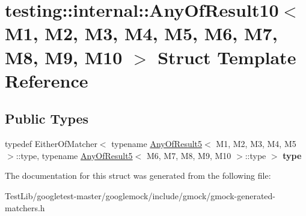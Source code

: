 \hypertarget{structtesting_1_1internal_1_1AnyOfResult10}{}\section{testing\+:\+:internal\+:\+:Any\+Of\+Result10$<$ M1, M2, M3, M4, M5, M6, M7, M8, M9, M10 $>$ Struct Template Reference}
\label{structtesting_1_1internal_1_1AnyOfResult10}
\subsection*{Public Types}
\begin{DoxyCompactItemize}
\item 
\mbox{\label{structtesting_1_1internal_1_1AnyOfResult10_aa1cb3d733f29716f2015db8a2b6c1c94}} 
typedef Either\+Of\+Matcher$<$ typename \hyperlink{structtesting_1_1internal_1_1AnyOfResult5}{Any\+Of\+Result5}$<$ M1, M2, M3, M4, M5 $>$\+::type, typename \hyperlink{structtesting_1_1internal_1_1AnyOfResult5}{Any\+Of\+Result5}$<$ M6, M7, M8, M9, M10 $>$\+::type $>$ {\bfseries type}
\end{DoxyCompactItemize}


The documentation for this struct was generated from the following file\+:\begin{DoxyCompactItemize}
\item 
Test\+Lib/googletest-\/master/googlemock/include/gmock/gmock-\/generated-\/matchers.\+h\end{DoxyCompactItemize}
